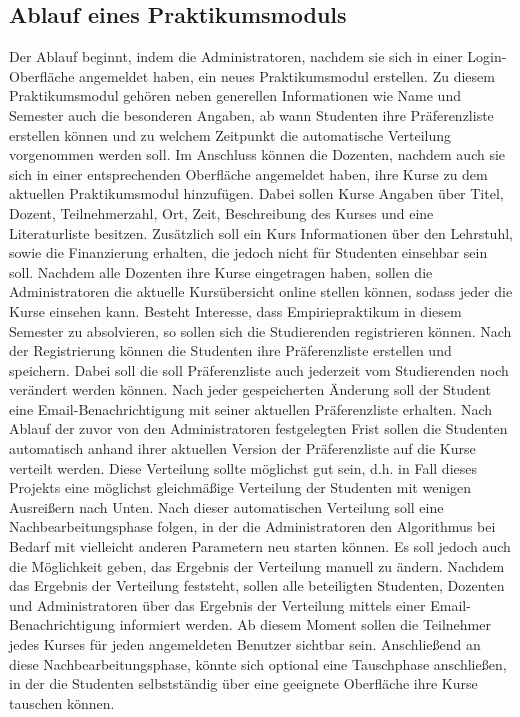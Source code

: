         \subsection{Ablauf eines Praktikumsmoduls}
            Der Ablauf beginnt, indem die Administratoren, nachdem sie sich in einer Login-Oberfläche angemeldet haben, ein neues Praktikumsmodul erstellen.
            Zu diesem Praktikumsmodul gehören neben generellen Informationen wie Name und Semester auch die besonderen Angaben, ab wann Studenten ihre Präferenzliste erstellen können und zu welchem Zeitpunkt die automatische Verteilung vorgenommen werden soll.
            Im Anschluss können die Dozenten, nachdem auch sie sich in einer entsprechenden Oberfläche angemeldet haben, ihre Kurse zu dem aktuellen Praktikumsmodul hinzufügen.
            Dabei sollen Kurse Angaben über Titel, Dozent, Teilnehmerzahl, Ort, Zeit, Beschreibung des Kurses und eine Literaturliste besitzen.
            Zusätzlich soll ein Kurs Informationen über den Lehrstuhl, sowie die Finanzierung erhalten, die jedoch nicht für Studenten einsehbar sein soll.
            Nachdem alle Dozenten ihre Kurse eingetragen haben, sollen die Administratoren die aktuelle Kursübersicht online stellen können, sodass jeder die Kurse einsehen kann.
            Besteht Interesse, dass Empiriepraktikum in diesem Semester zu absolvieren, so sollen sich die Studierenden registrieren können.
            Nach der Registrierung können die Studenten ihre Präferenzliste erstellen und speichern.
            Dabei soll die soll Präferenzliste auch jederzeit vom Studierenden noch verändert werden können.
            Nach jeder gespeicherten Änderung soll der Student eine Email-Benachrichtigung mit seiner aktuellen Präferenzliste erhalten.
            Nach Ablauf der zuvor von den Administratoren festgelegten Frist sollen die Studenten automatisch anhand ihrer aktuellen Version der Präferenzliste auf die Kurse verteilt werden.
            Diese Verteilung sollte möglichst gut sein, d.h. in Fall dieses Projekts eine möglichst gleichmäßige Verteilung der Studenten mit wenigen Ausreißern nach Unten.
            Nach dieser automatischen Verteilung soll eine Nachbearbeitungsphase folgen, in der die Administratoren den Algorithmus bei Bedarf mit vielleicht anderen Parametern neu starten können.
            Es soll jedoch auch die Möglichkeit geben, das Ergebnis der Verteilung manuell zu ändern.
            Nachdem das Ergebnis der Verteilung feststeht, sollen alle beteiligten Studenten, Dozenten und Administratoren über das Ergebnis der Verteilung mittels einer Email-Benachrichtigung informiert werden.
            Ab diesem Moment sollen die Teilnehmer jedes Kurses für jeden angemeldeten Benutzer sichtbar sein.
            Anschließend an diese Nachbearbeitungsphase, könnte sich optional eine Tauschphase anschließen, in der die Studenten selbstständig über eine geeignete Oberfläche ihre Kurse tauschen können.
                     
